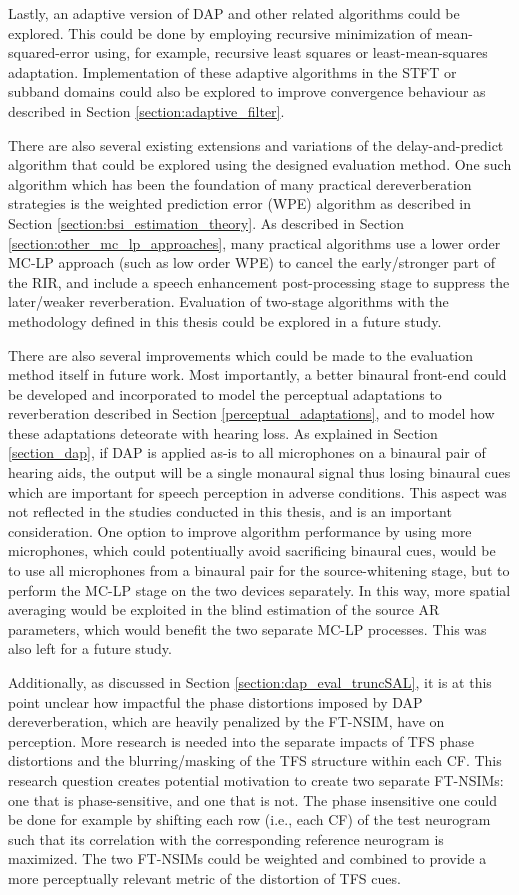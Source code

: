 Lastly, an adaptive version of DAP and other related algorithms could be explored. This could be done by employing recursive minimization of mean-squared-error using, for example, recursive least squares or least-mean-squares adaptation. Implementation of these adaptive algorithms in the STFT or subband domains could also be explored to improve convergence behaviour as described in Section \ref{section:adaptive_filter}.

There are also several existing extensions and variations of the delay-and-predict algorithm that could be explored using the designed evaluation method. One such algorithm which has been the foundation of many practical dereverberation strategies is the weighted prediction error (WPE) algorithm as described in Section \ref{section:bsi_estimation_theory}. As described in Section \ref{section:other_mc_lp_approaches}, many practical algorithms use a lower order MC-LP approach (such as low order WPE) to cancel the early/stronger part of the RIR, and include a speech enhancement post-processing stage to suppress the later/weaker reverberation. Evaluation of two-stage algorithms with the methodology defined in this thesis could be explored in a future study.

There are also several improvements which could be made to the evaluation method itself in future work. Most importantly, a better binaural front-end could be developed and incorporated to model the perceptual adaptations to reverberation described in Section \ref{perceptual_adaptations}, and to model how these adaptations deteorate with hearing loss. As explained in Section \ref{section_dap}, if DAP is applied as-is to all microphones on a binaural pair of hearing aids, the output will be a single monaural signal thus losing binaural cues which are important for speech perception in adverse conditions. This aspect was not reflected in the studies conducted in this thesis, and is an important consideration. One option to improve algorithm performance by using more microphones, which could potentiually avoid sacrificing binaural cues, would be to use all microphones from a binaural pair for the source-whitening stage, but to perform the MC-LP stage on the two devices separately. In this way, more spatial averaging would be exploited in the blind estimation of the source AR parameters, which would benefit the two separate MC-LP processes. This was also left for a future study. 

Additionally, as discussed in Section \ref{section:dap_eval_truncSAL}, it is at this point unclear how impactful the phase distortions imposed by DAP dereverberation, which are heavily penalized by the FT-NSIM, have on perception. More research is needed into the separate impacts of TFS phase distortions and the blurring/masking of the TFS structure within each CF. This research question creates potential motivation to create two separate FT-NSIMs: one that is phase-sensitive, and one that is not. The phase insensitive one could be done for example by shifting each row (i.e., each CF) of the test neurogram such that its correlation with the corresponding reference neurogram is maximized. The two FT-NSIMs could be weighted and combined to provide a more perceptually relevant metric of the distortion of TFS cues.


